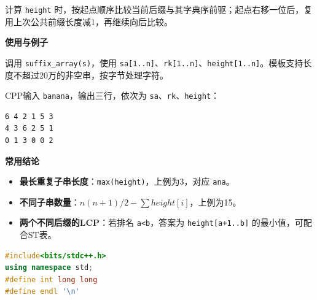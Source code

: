 \documentclass[10pt,landscape,a4paper]{article}
\begin{document}
\begin{multicols*}{3}
计算 \texttt{h\allowbreak{}e\allowbreak{}i\allowbreak{}g\allowbreak{}h\allowbreak{}t} 时，按起点顺序比较当前后缀与其字典序前驱；起点右移一位后，复用上次公共前缀长度减1，再继续向后比较。\par
\par\addvspace{0.7ex}\noindent\textbf{使用与例子}\par\nobreak
调用 \texttt{s\allowbreak{}u\allowbreak{}f\allowbreak{}f\allowbreak{}i\allowbreak{}x\allowbreak{}\_\allowbreak{}a\allowbreak{}r\allowbreak{}r\allowbreak{}a\allowbreak{}y\allowbreak{}(\allowbreak{}s\allowbreak{})}，使用 \texttt{s\allowbreak{}a\allowbreak{}[\allowbreak{}1\allowbreak{}.\allowbreak{}.\allowbreak{}n\allowbreak{}]}、\texttt{r\allowbreak{}k\allowbreak{}[\allowbreak{}1\allowbreak{}.\allowbreak{}.\allowbreak{}n\allowbreak{}]}、\texttt{h\allowbreak{}e\allowbreak{}i\allowbreak{}g\allowbreak{}h\allowbreak{}t\allowbreak{}[\allowbreak{}1\allowbreak{}.\allowbreak{}.\allowbreak{}n\allowbreak{}]}。模板支持长度不超过20万的非空串，按字节处理字符。\par
CPP输入 \texttt{b\allowbreak{}a\allowbreak{}n\allowbreak{}a\allowbreak{}n\allowbreak{}a}，输出三行，依次为 \texttt{s\allowbreak{}a}、\texttt{r\allowbreak{}k}、\texttt{h\allowbreak{}e\allowbreak{}i\allowbreak{}g\allowbreak{}h\allowbreak{}t}：\par
\begin{lstlisting}[language={},numbers=none,basicstyle=\footnotesize\ttfamily]
6 4 2 1 5 3
4 3 6 2 5 1
0 1 3 0 0 2
\end{lstlisting}

\par\addvspace{0.7ex}\noindent\textbf{常用结论}\par\nobreak
\begin{itemize}
\item \textbf{最长重复子串长度}：\texttt{m\allowbreak{}a\allowbreak{}x\allowbreak{}(\allowbreak{}h\allowbreak{}e\allowbreak{}i\allowbreak{}g\allowbreak{}h\allowbreak{}t\allowbreak{})}，上例为3，对应 \texttt{a\allowbreak{}n\allowbreak{}a}。
\item \textbf{不同子串数量}：$n(n+1)/2-\sum height[i]$，上例为15。
\item \textbf{两个不同后缀的LCP}：若排名 \texttt{a\allowbreak{}\textless{}\allowbreak{}b}，答案为 \texttt{h\allowbreak{}e\allowbreak{}i\allowbreak{}g\allowbreak{}h\allowbreak{}t\allowbreak{}[\allowbreak{}a\allowbreak{}+\allowbreak{}1\allowbreak{}.\allowbreak{}.\allowbreak{}b\allowbreak{}]} 的最小值，可配合ST表。
\end{itemize}
\par{}\par
\begin{lstlisting}[language=C++]
#include<bits/stdc++.h>
using namespace std;
#define int long long
#define endl '\n'


\end{lstlisting}
\end{multicols*}
\end{document}
